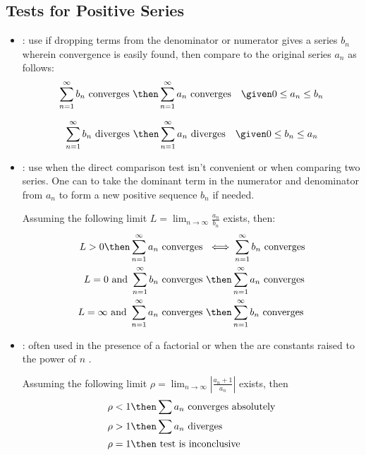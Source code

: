 \subsection{Tests for Positive Series}
\begin{itemize}
  \item {}: use if dropping terms from the
    denominator or numerator gives a series \(b_n\) wherein convergence
    is easily found, then compare to the original series \(a_n\) as
    follows:
    \[%
      \sum_{n=1}^{\infty} b_n ~\text{converges}~ \then
      \sum_{n=1}^{\infty} a_n ~\text{converges} \quad \given 0 \leq a_n
      \leq b_n
    \]%

    \[%
      \sum_{n=1}^{\infty} b_n ~\text{diverges}~ \then
      \sum_{n=1}^{\infty} a_n ~\text{diverges} \quad \given 0 \leq
      b_n \leq a_n
    \]%

  \item {}: use when the direct comparison test
    isn't convenient or when comparing two series. One can to take the
    dominant term in the numerator and denominator from \(a_n\) to form
    a new positive sequence \(b_n\) if needed.

    Assuming the following limit \(L = \lim_{n \to \infty}
    \frac{a_n}{b_n}\) exists, then:
    \begin{align*}
      L > 0 \then \sum_{n=1}^{\infty} a_n  ~\text{converges}~
      &\iff
      \sum_{n=1}^{\infty} b_n ~\text{converges}\\
      L = 0 ~\text{and}~ \sum_{n=1}^{\infty} b_n ~\text{converges}~
      &\then
      \sum_{n=1}^{\infty} a_n ~\text{converges}\\
      L = \infty ~\text{and}~ \sum_{n=1}^{\infty} a_n ~\text{converges}~
      &\then \sum_{n=1}^{\infty} b_n ~\text{converges}
    \end{align*}

    \newpage %

  \item {}: often used in the presence of a factorial
     or when the are constants raised to the power of
    \(n\) .

    Assuming the following limit \(\rho = \lim_{n \to \infty} \left|
    \frac{a_n + 1}{a_n} \right| \) exists, then
    \begin{align*}
      \rho &< 1 \then \sum a_n ~\text{converges absolutely} \\
      \rho &> 1 \then \sum a_n ~\text{diverges} \\
      \rho &= 1 \then ~\text{test is inconclusive}~
    \end{align*}


\end{itemize}
